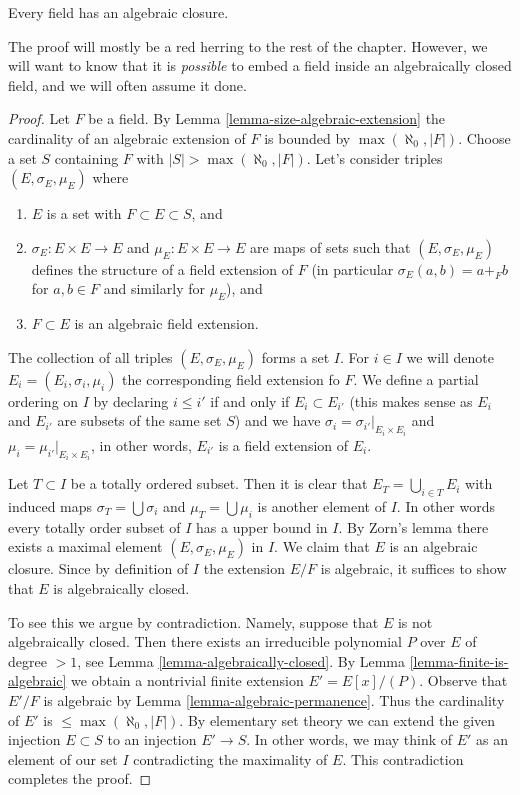 \begin{theorem}
\label{theorem-existence-algebraic-closure}
Every field has an algebraic closure.
\end{theorem}

\noindent
The proof will mostly be a red herring to the rest of the chapter. However, we
will want to know that it is {\it possible} to embed a field inside an
algebraically closed field, and we will often assume it done.

\begin{proof}
Let $F$ be a field. By Lemma \ref{lemma-size-algebraic-extension} the
cardinality of an algebraic extension of $F$ is bounded by
$\max(\aleph_0, |F|)$. Choose a set $S$ containing $F$ with
$|S| > \max(\aleph_0, |F|)$. Let's consider triples
$(E, \sigma_E, \mu_E)$ where
\begin{enumerate}
\item $E$ is a set with $F \subset E \subset S$, and
\item $\sigma_E : E \times E \to E$ and $\mu_E : E \times E \to E$
are maps of sets such that $(E, \sigma_E, \mu_E)$ defines the structure
of a field extension of $F$ (in particular $\sigma_E(a, b) = a +_F b$
for $a, b \in F$ and similarly for $\mu_E$), and
\item $F \subset E$ is an algebraic field extension.
\end{enumerate}
The collection of all triples $(E, \sigma_E, \mu_E)$ forms a set $I$.
For $i \in I$ we will denote $E_i = (E_i, \sigma_i, \mu_i)$ the
corresponding field extension fo $F$. We define a partial ordering on
$I$ by declaring $i \leq i'$ if and only if $E_i \subset E_{i'}$
(this makes sense as $E_i$ and $E_{i'}$ are subsets of the same set $S$)
and we have $\sigma_i = \sigma_{i'}|_{E_i \times E_i}$ and
$\mu_i = \mu_{i'}|_{E_i \times E_i}$, in other words, $E_{i'}$ is a field
extension of $E_i$.

\medskip\noindent
Let $T \subset I$ be a totally ordered subset. Then it is clear that
$E_T = \bigcup_{i \in T} E_i$ with induced maps $\sigma_T = \bigcup \sigma_i$
and $\mu_T = \bigcup \mu_i$ is another element of $I$. In other words
every totally order subset of $I$ has a upper bound in $I$. By Zorn's lemma
there exists a maximal element $(E, \sigma_E, \mu_E)$ in $I$. We claim that
$E$ is an algebraic closure. Since by definition of $I$ the extension
$E/F$ is algebraic, it suffices to show that $E$ is algebraically closed.

\medskip\noindent
To see this we argue by contradiction. Namely, suppose that $E$ is not
algebraically closed. Then there exists an irreducible polynomial
$P$ over $E$ of degree $> 1$, see Lemma \ref{lemma-algebraically-closed}.
By Lemma \ref{lemma-finite-is-algebraic} we obtain a nontrivial finite
extension $E' = E[x]/(P)$. Observe that $E'/F$ is algebraic by
Lemma \ref{lemma-algebraic-permanence}.
Thus the cardinality of $E'$ is $\leq \max(\aleph_0, |F|)$.
By elementary set theory we can extend the given injection
$E \subset S$ to an injection $E' \to S$. In other words, we may
think of $E'$ as an element of our set $I$ contradicting the
maximality of $E$. This contradiction completes the proof.
\end{proof}

